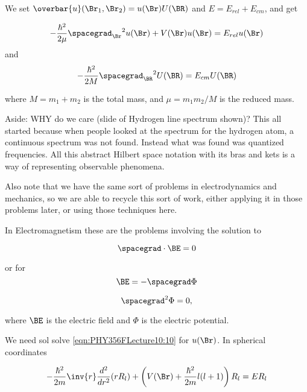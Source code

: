 We set $\overbar{u}(\Br_1, \Br_2) = u(\Br) U(\BR)$ and $E = E_{rel} + E_{cm}$, and get

\begin{equation}\label{eqn:PHY356FLecture10:10}
-\frac{\hbar^2}{2\mu} {\spacegrad_{\Br}}^2 u(\Br) + V(\Br) u(\Br) = E_{rel} u(\Br)
\end{equation}
and
\begin{equation}\label{eqn:PHY356FLecture10:20}
-\frac{\hbar^2}{2M} {\spacegrad_{\BR}}^2 U(\BR) = E_{cm} U(\BR)
\end{equation}

where $M = m_1 + m_2$ is the total mass, and $\mu = m_1 m_2/M$ is the reduced mass.

Aside: WHY do we care (slide of Hydrogen line spectrum shown)?  This all started because when people looked at the spectrum for the hydrogen atom, a continuous spectrum was not found.  Instead what was found was quantized frequencies.  All this abstract Hilbert space notation with its bras and kets is a way of representing observable phenomena.

Also note that we have the same sort of problems in electrodynamics and mechanics, so we are able to recycle this sort of work, either applying it in those problems later, or using those techniques here.

In Electromagnetism these are the problems involving the solution to

\begin{equation}\label{eqn:PHY356FLecture10:30}
\spacegrad \cdot \BE = 0
\end{equation}

or for
\begin{equation}\label{eqn:PHY356FLecture10:40}
\BE = - \spacegrad \Phi
\end{equation}


\begin{equation}\label{eqn:PHY356FLecture10:60}
\spacegrad^2 \Phi = 0,
\end{equation}

where $\BE$ is the electric field and $\Phi$ is the electric potential.


We need sol solve \ref{eqn:PHY356FLecture10:10} for $u(\Br)$.  In spherical coordinates

\begin{equation}\label{eqn:PHY356FLecture10:70}
-\frac{\hbar^2}{2m} \inv{r} \frac{d^2}{dr^2} ( r R_l ) + \left( V(\Br) + \frac{\hbar^2 }{2m} l(l+1) \right) R_l = E R_l
\end{equation}

